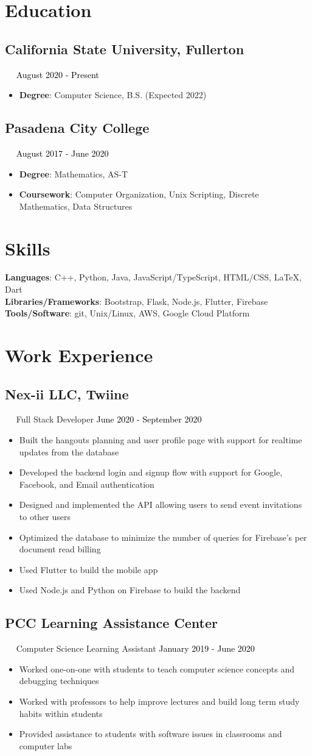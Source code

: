 \documentclass{article}
\newcommand{\resumesection}[3]{
    \subsection*{#1}
    \ 
    \ 
    \small
    \textcolor{csufgrey}{#2}
    \normalsize
    \hfill
    \textcolor{black}{#3}
    \normalsize
}
\begin{document}
\pagestyle{useheader}

\section*{Education}
\resumesection{California State University, Fullerton}{}{August 2020 - Present}
\begin{itemize}
    \item \textbf{Degree}: Computer Science, B.S. (Expected 2022)
\end{itemize}
\resumesection{Pasadena City College}{}{August 2017 - June 2020}
\begin{itemize}
    \item \textbf{Degree}: Mathematics, AS-T
    \item \textbf{Coursework}: Computer Organization, Unix Scripting, Discrete Mathematics, Data Structures
\end{itemize}
\hfill
\section*{Skills}
\textbf{Languages}: C++, Python, Java, JavaScript/TypeScript, HTML/CSS, {\selectfont\LaTeX}, Dart\\
\textbf{Libraries/Frameworks}: Bootstrap, Flask, Node.js, Flutter, Firebase\\
\textbf{Tools/Software}: git, Unix/Linux, AWS, Google Cloud Platform
\\
\section*{Work Experience}
\resumesection{Nex-ii LLC, Twiine}{Full Stack Developer}{June 2020 - September 2020}
\begin{itemize}
    \item Built the hangouts planning and user profile page with support for realtime updates from the database
    \item Developed the backend login and signup flow with support for Google, Facebook, and Email authentication
    \item Designed and implemented the API allowing users to send event invitations to other users
    \item Optimized the database to minimize the number of queries for Firebase's per document read billing
    \item Used Flutter to build the mobile app
    \item Used Node.js and Python on Firebase to build the backend
\end{itemize}
\resumesection{PCC Learning Assistance Center}{Computer Science Learning Assistant}{January 2019 - June 2020}
\begin{itemize}
    \item Worked one-on-one with students to teach computer science concepts and debugging techniques
    \item Worked with professors to help improve lectures and build long term study habits within students
    \item Provided assistance to students with software issues in classrooms and computer labs
\end{itemize}
\hfill
\end{document}
